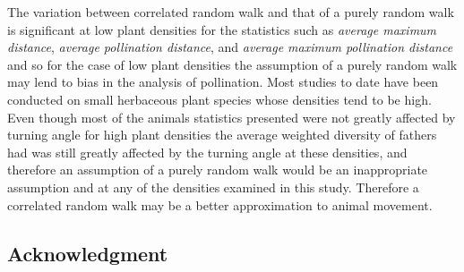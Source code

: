 \documentclass{tran-l}
\theoremstyle{definition}
\theoremstyle{remark}
\numberwithin{equation}{subsection}
\begin{document}
The variation between correlated random walk and that of a purely random walk is
significant at low plant densities for the statistics such as \emph{average
maximum distance}, \emph{average pollination distance}, and \emph{average
maximum pollination distance} and so for the case of low plant densities the
assumption of a purely random walk may lend to bias in the analysis of
pollination. Most studies to date have been conducted on small herbaceous plant
species whose densities tend to be high. Even though most of the animals
statistics presented were not greatly affected by turning angle for high plant
densities the average weighted diversity of fathers had was still greatly
affected by the turning angle at these densities, and therefore an assumption of
a purely random walk would be an inappropriate assumption and at any of the
densities examined in this study. Therefore a correlated random walk may be a
better approximation to animal movement.

\subsection*{Acknowledgment}




\end{document}
